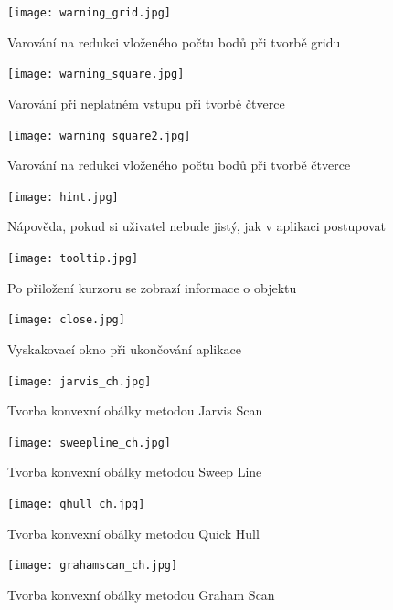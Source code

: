 \documentclass[a4paper, 12pt]{article}
\begin{document}
\begin{figure}[h!]
	\centering
	\texttt{[image: warning\_grid.jpg]}
	\caption{Varování na redukci vloženého počtu bodů při tvorbě gridu }
\end{figure}

\begin{figure}[h!]
	\centering
	\texttt{[image: warning\_square.jpg]}
	\caption{Varování při neplatném vstupu při tvorbě čtverce}
\end{figure}

\begin{figure}[h!]
	\centering
	\texttt{[image: warning\_square2.jpg]}
	\caption{Varování na redukci vloženého počtu bodů při tvorbě čtverce}
\end{figure}

\begin{figure}[h!]
	\centering
	\texttt{[image: hint.jpg]}
	\caption{Nápověda, pokud si uživatel nebude jistý, jak v aplikaci postupovat}
\end{figure}

\begin{figure}[h!]
	\centering
	\texttt{[image: tooltip.jpg]}
	\caption{Po přiložení kurzoru se zobrazí informace o objektu}
\end{figure}

\begin{figure}[h!]
	\centering
	\texttt{[image: close.jpg]}
	\caption{Vyskakovací okno při ukončování aplikace}
\end{figure}

\begin{figure}[h!]
	\centering
	\texttt{[image: jarvis\_ch.jpg]}
	\caption{Tvorba konvexní obálky metodou Jarvis Scan}
\end{figure}

\begin{figure}[h!]
	\centering
	\texttt{[image: sweepline\_ch.jpg]}
	\caption{Tvorba konvexní obálky metodou Sweep Line}
\end{figure}

\begin{figure}[h!]
	\centering
	\texttt{[image: qhull\_ch.jpg]}
	\caption{Tvorba konvexní obálky metodou Quick Hull}
\end{figure}

\begin{figure}[h!]
	\centering
	\texttt{[image: grahamscan\_ch.jpg]}
	\caption{Tvorba konvexní obálky metodou Graham Scan}
\end{figure}
\end{document}
